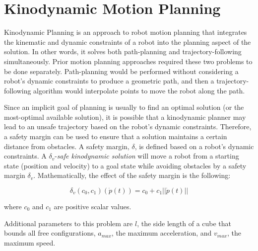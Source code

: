 

\section{ Kinodynamic Motion Planning } \label{sec:kino}

Kinodynamic Planning is an approach to robot motion planning that integrates the kinematic and dynamic constraints of a robot into the planning aspect of the solution. In other words, it solves both path-planning and trajectory-following simultaneously. Prior motion planning approaches required these two problems to be done separately. Path-planning would be performed without considering a robot's dynamic constraints to produce a geometric path, and then a trajectory-following algorithm would interpolate points to move the robot along the path. 



Since an implicit goal of planning is usually to find an optimal solution (or the most-optimal available solution), it is possible that a kinodynamic planner may lead to an unsafe trajectory based on the robot's dynamic constraints. Therefore, a safety margin can be used to ensure that a solution maintains a certain distance from obstacles. A safety margin, $\delta$, is defined based on a robot's dynamic constraints. A $\delta_v$-\emph{safe kinodynamic solution} will move a robot from a starting state (position and velocity) to a goal state while avoiding obstacles by a safety margin $\delta_v$. Mathematically, the effect of the safety margin is the following:

\begin{equation}
\delta_v(c_0, c_1)(\dot{p}(t)) = c_0 + c_1||\dot{p}(t)||
\end{equation}

where $c_0$ and $c_1$ are positive scalar values.

Additional parameters to this problem are $l$, the side length of a cube that bounds all free configurations, $a_{max}$, the maximum acceleration, and $v_{max}$, the maximum speed.



